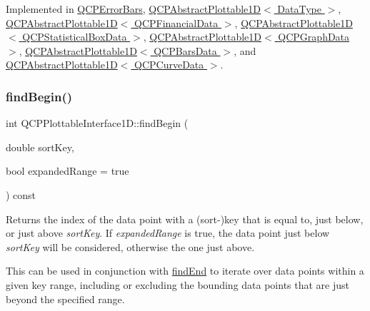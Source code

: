 Implemented in \hyperlink{class_q_c_p_error_bars_a09b99cf293b6041ae8d5c52cf8dd599c}{Q\+C\+P\+Error\+Bars}, \hyperlink{class_q_c_p_abstract_plottable1_d_ac6201b01aee550ef0a240183781d1f9a}{Q\+C\+P\+Abstract\+Plottable1\+D$<$ Data\+Type $>$}, \hyperlink{class_q_c_p_abstract_plottable1_d_ac6201b01aee550ef0a240183781d1f9a}{Q\+C\+P\+Abstract\+Plottable1\+D$<$ Q\+C\+P\+Financial\+Data $>$}, \hyperlink{class_q_c_p_abstract_plottable1_d_ac6201b01aee550ef0a240183781d1f9a}{Q\+C\+P\+Abstract\+Plottable1\+D$<$ Q\+C\+P\+Statistical\+Box\+Data $>$}, \hyperlink{class_q_c_p_abstract_plottable1_d_ac6201b01aee550ef0a240183781d1f9a}{Q\+C\+P\+Abstract\+Plottable1\+D$<$ Q\+C\+P\+Graph\+Data $>$}, \hyperlink{class_q_c_p_abstract_plottable1_d_ac6201b01aee550ef0a240183781d1f9a}{Q\+C\+P\+Abstract\+Plottable1\+D$<$ Q\+C\+P\+Bars\+Data $>$}, and \hyperlink{class_q_c_p_abstract_plottable1_d_ac6201b01aee550ef0a240183781d1f9a}{Q\+C\+P\+Abstract\+Plottable1\+D$<$ Q\+C\+P\+Curve\+Data $>$}.

\mbox{\label{class_q_c_p_plottable_interface1_d_a5b95783271306a4de97be54eac1e7d13}} 
\subsubsection{\texorpdfstring{find\+Begin()}{findBegin()}}
{\footnotesize\ttfamily int Q\+C\+P\+Plottable\+Interface1\+D\+::find\+Begin (\begin{DoxyParamCaption}\item[{double}]{sort\+Key,  }\item[{bool}]{expanded\+Range = {\ttfamily true} }\end{DoxyParamCaption}) const\hspace{0.3cm}{\ttfamily [pure virtual]}}

Returns the index of the data point with a (sort-\/)key that is equal to, just below, or just above {\itshape sort\+Key}. If {\itshape expanded\+Range} is true, the data point just below {\itshape sort\+Key} will be considered, otherwise the one just above.

This can be used in conjunction with \hyperlink{class_q_c_p_plottable_interface1_d_a5deced1016bc55a41a2339619045b295}{find\+End} to iterate over data points within a given key range, including or excluding the bounding data points that are just beyond the specified range.

